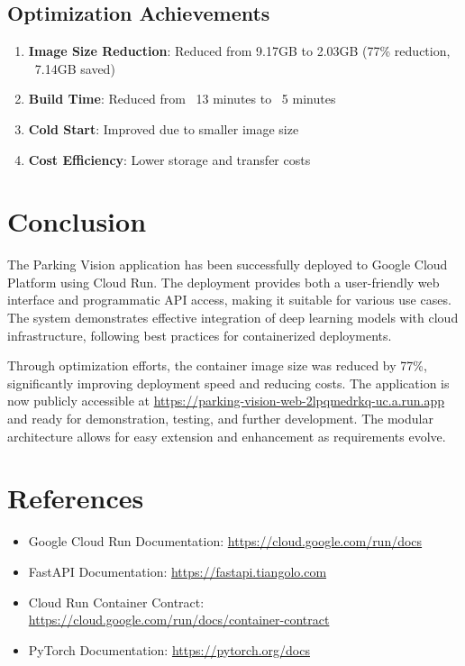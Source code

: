 \documentclass[12pt,a4paper]{article}
\begin{document}
\subsection{Optimization Achievements}
\begin{enumerate}
    \item \textbf{Image Size Reduction}: Reduced from 9.17GB to 2.03GB (77\% reduction, ~7.14GB saved)
    \item \textbf{Build Time}: Reduced from ~13 minutes to ~5 minutes
    \item \textbf{Cold Start}: Improved due to smaller image size
    \item \textbf{Cost Efficiency}: Lower storage and transfer costs
\end{enumerate}

\section{Conclusion}

The Parking Vision application has been successfully deployed to Google Cloud Platform using Cloud Run. The deployment provides both a user-friendly web interface and programmatic API access, making it suitable for various use cases. The system demonstrates effective integration of deep learning models with cloud infrastructure, following best practices for containerized deployments.

Through optimization efforts, the container image size was reduced by 77\%, significantly improving deployment speed and reducing costs. The application is now publicly accessible at \url{https://parking-vision-web-2lpqmedrkq-uc.a.run.app} and ready for demonstration, testing, and further development. The modular architecture allows for easy extension and enhancement as requirements evolve.

\section{References}

\begin{itemize}
    \item Google Cloud Run Documentation: \url{https://cloud.google.com/run/docs}
    \item FastAPI Documentation: \url{https://fastapi.tiangolo.com}
    \item Cloud Run Container Contract: \url{https://cloud.google.com/run/docs/container-contract}
    \item PyTorch Documentation: \url{https://pytorch.org/docs}
\end{itemize}
\end{document}
